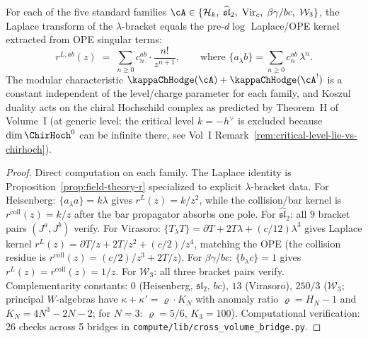 \begin{proposition}
\label{prop:dk0-laplace-five-families}
For each of the five standard families
$\cA \in \{\mathcal{H}_k,\;
\widehat{\mathfrak{sl}}_2,\;
\mathrm{Vir}_c,\;
\beta\gamma\text{/}bc,\;
\mathcal{W}_3\}$,
the Laplace transform of the $\lambda$-bracket equals the
pre-\textup{\(d\log\)} Laplace/OPE kernel extracted from OPE singular
terms:
\[
 r^{L,ab}(z)
 \;=\;
 \sum_{n \geq 0}
 c_n^{ab} \cdot \frac{n!}{z^{n+1}},
 \qquad
 \text{where }
 \{a_\lambda b\} = \sum_{n \geq 0} c_n^{ab}\, \lambda^n.
\]
The modular characteristic $\kappaChHodge(\cA) + \kappaChHodge(\cA^!)$
is a constant independent of the level/charge parameter for each family,
and Koszul duality acts on the chiral Hochschild complex as predicted by
Theorem~H of Volume~I (at generic level; the critical level $k = -h^\vee$
is excluded because $\dim \ChirHoch^0$ can be infinite there, see Vol~I
Remark~\ref*{rem:critical-level-lie-vs-chirhoch}).
\end{proposition}

\begin{proof}
Direct computation on each family. The Laplace identity
is Proposition~\ref{prop:field-theory-r} specialized to explicit
$\lambda$-bracket data.
For Heisenberg: $\{a_\lambda a\} = k\lambda$ gives
$r^L(z)=k/z^2$, while the collision/bar kernel is
$r^{\mathrm{coll}}(z)=k/z$ after the bar propagator absorbs one pole.
For $\widehat{\mathfrak{sl}}_2$: all $9$ bracket pairs
$(J^a, J^b)$ verify.
For Virasoro: $\{T_\lambda T\} = \partial T + 2T\lambda
+ (c/12)\lambda^3$ gives Laplace kernel $r^L(z) = \partial T/z + 2T/z^2
+ (c/2)/z^4$, matching the OPE
(the collision residue is $r^{\mathrm{coll}}(z) = (c/2)/z^3 + 2T/z$).
For $\beta\gamma$/$bc$: $\{b_\lambda c\} = 1$ gives
$r^L(z)=r^{\mathrm{coll}}(z)=1/z$.
For $\mathcal{W}_3$: all three bracket pairs verify.
Complementarity constants: $0$ (Heisenberg, $\mathfrak{sl}_2$,
$bc$), $13$ (Virasoro), $250/3$ ($\mathcal{W}_3$; principal
$W$-algebras have $\kappa + \kappa' = \varrho \cdot K_N$
with anomaly ratio $\varrho = H_N - 1$ and
$K_N = 4N^3 - 2N - 2$; for $N = 3$:
$\varrho = 5/6$, $K_3 = 100$).
Computational verification: 26 checks across 5 bridges in
\texttt{compute/lib/cross\_volume\_bridge.py}.
\end{proof}

